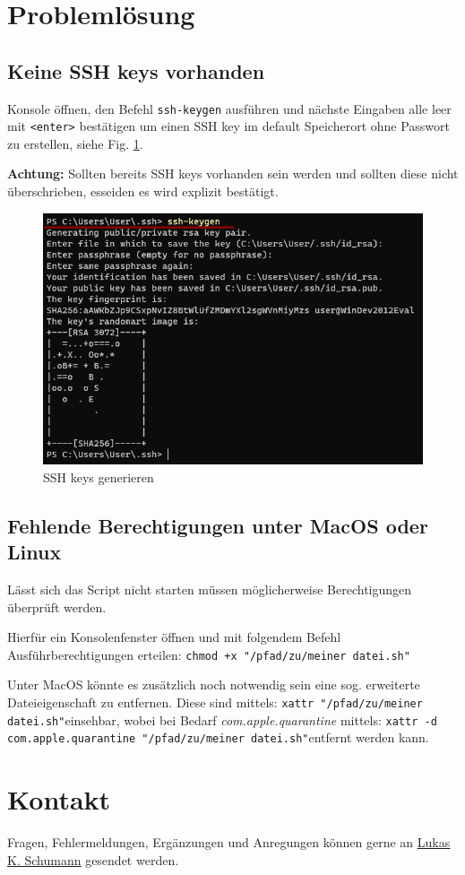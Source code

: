 \documentclass[11pt, a4paper]{article}
\begin{document}
\section{Problemlösung}

\subsection{Keine SSH keys vorhanden}\label{sec:ssh}
Konsole öffnen, den Befehl \texttt{ssh-keygen} ausführen und nächste Eingaben alle leer mit \texttt{<enter>} bestätigen um einen SSH key im default Speicherort ohne Passwort zu erstellen, siehe Fig. \ref{fig:ssh}.

\textbf{Achtung:} Sollten bereits SSH keys vorhanden sein werden und sollten diese nicht überschrieben, esseiden es wird explizit bestätigt.

\begin{figure}[h]
    \centering
    \includegraphics[width=0.7\linewidth]{./pics/2022-03-09_00-17.png}
    \caption{SSH keys generieren}
    \label{fig:ssh}
\end{figure}

\subsection{Fehlende Berechtigungen unter MacOS oder Linux}
Lässt sich das Script nicht starten müssen möglicherweise Berechtigungen überprüft werden.

Hierfür ein Konsolenfenster öffnen und mit folgendem Befehl Ausführberechtigungen erteilen: \newline\texttt{chmod +x "/pfad/zu/meiner datei.sh"}

Unter MacOS könnte es zusätzlich noch notwendig sein eine sog. erweiterte Dateieigenschaft zu entfernen.
Diese sind mittels: \newline\texttt{xattr "/pfad/zu/meiner datei.sh"}\newline einsehbar, wobei bei Bedarf \emph{com.apple.quarantine} mittels: \newline\texttt{xattr -d com.apple.quarantine "/pfad/zu/meiner datei.sh"}\newline entfernt werden kann.


\section{Kontakt}

Fragen, Fehlermeldungen, Ergänzungen und Anregungen können gerne an \underline{\href{mailto:lukas_kilian.schumann@stud-mail.uni-wuerzburg.de}{Lukas K. Schumann}} gesendet werden.
\end{document}
